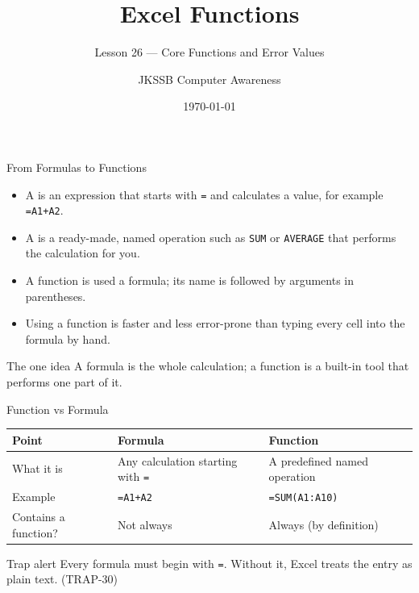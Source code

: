 \documentclass[aspectratio=169]{beamer}
\title{Excel Functions}
\subtitle{Lesson 26 --- Core Functions and Error Values}
\author{JKSSB Computer Awareness}
\date{\today}
\begin{document}
\frame{\titlepage}

\begin{frame}{From Formulas to Functions}
  \begin{itemize}
    \item A  is an expression that starts with \texttt{=} and
      calculates a value, for example \texttt{=A1+A2}.
    \item A  is a ready-made, named operation such as
      \texttt{SUM} or \texttt{AVERAGE} that performs the calculation for you.
    \item A function is used  a formula; its name is followed by
      arguments in parentheses.
    \item Using a function is faster and less error-prone than typing every
      cell into the formula by hand.
  \end{itemize}
  \begin{block}{The one idea}
    A formula is the whole calculation; a function is a built-in tool that
    performs one part of it.
  \end{block}
\end{frame}

\begin{frame}{Function vs Formula}
  \begin{center}
    \begin{tabular}{p{}p{}p{}}
      \toprule
      \textbf{Point} & \textbf{Formula} & \textbf{Function} \\
      \midrule
      What it is & Any calculation starting with \texttt{=} & A predefined named operation \\
      Example & \texttt{=A1+A2} & \texttt{=SUM(A1:A10)} \\
      Contains a function? & Not always & Always (by definition) \\
      \bottomrule
    \end{tabular}
  \end{center}
  \vspace{0.25cm}
  \begin{alertblock}{Trap alert}
    Every formula must begin with \texttt{=}. Without it, Excel treats the
    entry as plain text. (TRAP-30)
  \end{alertblock}
\end{frame}
\end{document}
